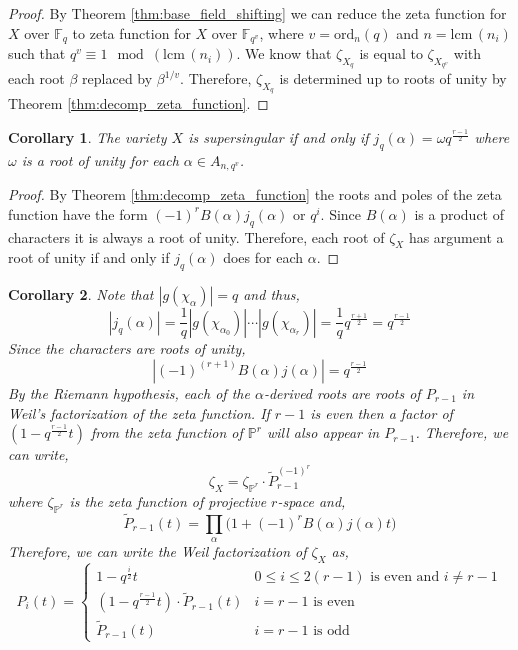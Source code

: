 \documentclass{article}
\renewcommand{\P}{\mathbb{P}}
\newcommand{\F}{\mathbb{F}}
\newcommand{\lcm}[0]{\mathrm{lcm} \,}
\newcommand{\ord}[0]{\mathrm{ord}}
\newtheorem{corollary}{Corollary}[theorem]
\theoremstyle{definition}
\theoremstyle{definition}
\theoremstyle{remark}
\begin{document}
\begin{proof}
By Theorem \ref{thm:base_field_shifting} we can reduce the zeta function for $X$ over $\F_q$ to zeta function for $X$ over $\F_{q^v}$, where $v = \ord_n(q)$ and $n = \lcm(n_i)$ such that $q^v \equiv 1 \mod (\lcm(n_i))$. We know that $\zeta_{X_q}$ is equal to $\zeta_{X_{q^v}}$ with each root $\beta$ replaced by $\beta^{1/v}$. Therefore, $\zeta_{X_q}$ is determined up to roots of unity by Theorem \ref{thm:decomp_zeta_function}.
\end{proof}

\begin{corollary} \label{cor:supersingular_iff_gauss_sum_products_roots_of_unity}
The variety $X$ is supersingular if and only if $j_q(\alpha) = \omega q^{\frac{r-1}{2}}$ where $\omega$ is a root of unity for each $\alpha \in A_{n,q^v}$. 
\end{corollary}

\begin{proof}
By Theorem \ref{thm:decomp_zeta_function} the roots and poles of the zeta function have the form $(-1)^r B(\alpha) j_q(\alpha)$ or $q^i$. Since $B(\alpha)$ is a product of characters it is always a root of unity. Therefore, each root of $\zeta_X$ has argument a root of unity if and only if $j_q(\alpha)$ does for each $\alpha$. 
\end{proof}

\begin{corollary}
Note that $|g(\chi_\alpha)| = q$ and thus,
\[ | j_q(\alpha) | = \frac{1}{q} | g(\chi_{\alpha_0})| \cdots | g(\chi_{\alpha_r})| = \frac{1}{q} q^{\frac{r+1}{2}} = q^{\frac{r-1}{2}} \]
Since the characters are roots of unity,
\[ \left| (-1)^{(r + 1)} B(\alpha) j(\alpha) \right| = q^{\frac{r-1}{2}} \]
By the Riemann hypothesis, each of the $\alpha$-derived roots are roots of $P_{r-1}$ in Weil's factorization of the zeta function. If $r-1$ is even then a factor of $(1 - q^{\frac{r-1}{2}} t)$ from the zeta function of $\P^r$ will also appear in $P_{r-1}$. Therefore, we can write,
\[ \zeta_X = \zeta_{\P^r} \cdot \tilde{P}_{r-1}^{(-1)^r} \]
where $\zeta_{\P^r}$ is the zeta function of projective $r$-space and,
\[ \tilde{P}_{r-1}(t) = \prod_{\alpha} \bigg(1 + (-1)^r B(\alpha)j(\alpha)t \bigg) \]
Therefore, we can write the Weil factorization of $\zeta_X$ as,
\[ P_i(t) = 
\begin{cases}
1 - q^{\frac{i}{2}} t  & 0 \le i \le 2(r-1) \text{ is even and } i \neq r - 1 \\
(1 - q^{\frac{r-1}{2}} t) \cdot \tilde{P}_{r-1}(t) & i = r-1 \text{ is even} \\
 \tilde{P}_{r-1}(t) & i = r - 1 \text{ is odd}
\end{cases}
\]
\end{corollary}
\end{document}
